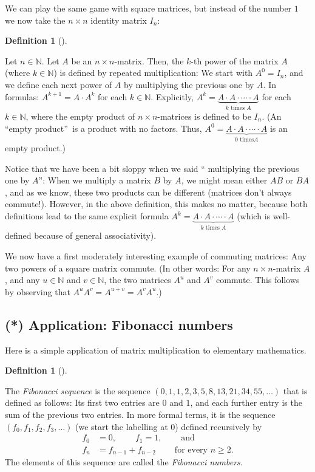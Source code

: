 \documentclass[numbers=enddot,12pt,final,onecolumn,notitlepage]{scrartcl}%
\theoremstyle{definition}
\newtheorem{defi}[theo]{Definition}
\newenvironment{definition}[1][]
{\begin{defi}[#1]\begin{leftbar}}
{\end{leftbar}\end{defi}}
\begin{document}
We can play the same game with square matrices, but instead of the number $1$
we now take the $n\times n$ identity matrix $I_{n}$:

\begin{definition}
Let $n\in\mathbb{N}$. Let $A$ be an $n\times n$-matrix. Then, the $k$-th power
of the matrix $A$ (where $k\in\mathbb{N}$) is defined by repeated
multiplication: We start with $A^{0}=I_{n}$, and we define each next power of
$A$ by multiplying the previous one by $A$. In formulas: $A^{k+1}=A\cdot
A^{k}$ for each $k\in\mathbb{N}$. Explicitly, $A^{k}=\underbrace{A\cdot
A\cdot\cdots\cdot A}_{k\text{ times }A}$ for each $k\in\mathbb{N}$, where the
empty product of $n\times n$-matrices is defined to be $I_{n}$. (An
\textquotedblleft empty product\textquotedblright\ is a product with no
factors. Thus, $A^{0}=\underbrace{A\cdot A\cdot\cdots\cdot A}_{0\text{ times
}A}$ is an empty product.)
\end{definition}

Notice that we have been a bit sloppy when we said \textquotedblleft
multiplying the previous one by $A$\textquotedblright: When we multiply a
matrix $B$ by $A$, we might mean either $AB$ or $BA$, and as we know, these
two products can be different (matrices don't always commute!). However, in
the above definition, this makes no matter, because both definitions lead to
the same explicit formula $A^{k}=\underbrace{A\cdot A\cdot\cdots\cdot
A}_{k\text{ times }A}$ (which is well-defined because of general associativity).

We now have a first moderately interesting example of commuting matrices: Any
two powers of a square matrix commute. (In other words: For any $n\times
n$-matrix $A$, and any $u\in\mathbb{N}$ and $v\in\mathbb{N}$, the two matrices
$A^{u}$ and $A^{v}$ commute. This follows by observing that $A^{u}%
A^{v}=A^{u+v}=A^{v}A^{u}$.)

\subsection{(*) Application: Fibonacci numbers}

Here is a simple application of matrix multiplication to elementary mathematics.

\begin{definition}
\label{def.fibonacci}The \textit{Fibonacci sequence} is the sequence $\left(
0,1,1,2,3,5,8,13,21,34,55,\ldots\right)  $ that is defined as follows: Its
first two entries are $0$ and $1$, and each further entry is the sum of the
previous two entries. In more formal terms, it is the sequence $\left(
f_{0},f_{1},f_{2},f_{3},\ldots\right)  $ (we start the labelling at $0$)
defined recursively by%
\begin{align*}
f_{0}  &  =0,\ \ \ \ \ \ \ \ \ \ f_{1}=1,\ \ \ \ \ \ \ \ \ \ \text{and}\\
f_{n}  &  =f_{n-1}+f_{n-2}\ \ \ \ \ \ \ \ \ \ \text{for every }n\geq2.
\end{align*}
The elements of this sequence are called the \textit{Fibonacci numbers}.
\end{definition}
\end{document}
